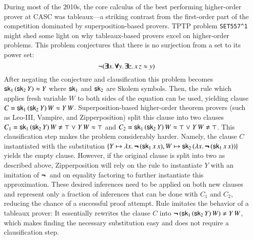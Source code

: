 During most of the 2010s, the core calculus of the best performing
higher-order prover at CASC was tableaux---a striking contrast from the first-order part
of the competition dominated by superposition-based provers. TPTP
problem \verb|SET557^1| might shed some light on why tableaux-based provers
excel on higher-order problems.
This problem conjectures that there is
no surjection from a set to its power set: 
$$ \neg (\pmb{\exists} x. \, \pmb{\forall} y. \,
\pmb{\exists} z. \, x \, z \approx y) $$ 
After negating the conjecture and
clausification this problem becomes $ \mathsf{sk}_1 \, (\mathsf{sk}_2 \, Y) \approx Y   $
where $\mathsf{sk}_1$ and $\mathsf{sk}_2$ are Skolem symbols. Then, the
 rule \cite{bbtvw-21-sup-lam} which applies
fresh variable $W$ to both sides of the equation can be used, yielding clause $ C = \mathsf{sk}_1 \, (\mathsf{sk}_2 \, Y) \, W
\approx Y \, W$. Superposition-based higher-order theorem
provers (such as Leo-III, Vampire, and Zipperposition) split this clause
into two clauses $C_1 = \cst{sk}_1 \, (\cst{sk}_2 \, Y) \, W \not\eq \top \llor Y
\, W \eq \top $ and $ C_2 =  \cst{sk}_1 \, (\cst{sk}_2 \, Y) \, W \eq \top \llor
Y \, W \not\eq \top $. This clausification step makes the problem
considerably harder. Namely, the clause $C$ instantiated with the substitution $
\{ Y \mapsto \lambda x.\> \pmb{\neg\,} (\mathsf{sk}_1 \, x \, x), W \mapsto \mathsf{sk}_2 \,
(\lambda x.\> \pmb{\neg\,} (\mathsf{sk}_1 \, x \, x)) \} $ yields the empty clause. However,
if the original clause is split into two as described above, Zipperposition will
rely on the  rule to instantiate $Y$ with an imitation of $\pmb{\neg\,}$ and on
equality factoring to further instantiate this approximation. These desired
inferences need to be applied on both new clauses and represent only a fraction
of inferences that can be done with $C_1$ and $C_2$, reducing the chance of a
successful proof attempt. Rule  imitates the behavior of
a tableaux prover: It essentially rewrites the clause $C$ into $ \inot (\cst{sk}_1 \,
(\cst{sk}_2 \, Y) \, W) \not\eq Y \, W $, which makes finding the necessary substitution easy and
does not require a clausification step.

